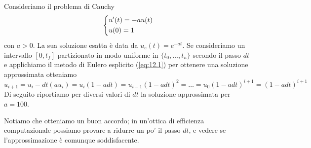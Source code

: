 \begin{example}
    Consideriamo il problema di Cauchy
    \[
    \begin{dcases}
        u'(t) = -au(t)\\
        u(0) = 1
    \end{dcases}
    \]
    con $a>0$. La sua soluzione esatta è data da $u_e(t) = e^{-at}$. Se consideriamo un intervallo $[0, t_f]$ partizionato in modo uniforme in $\{t_0, \dots, t_n\}$ secondo il passo $dt$ e applichiamo il metodo di Eulero esplicito (\ref{eq:12.1}) per ottenere una soluzione approssimata otteniamo
    \[
    u_{i+1} = u_i-dt(au_i) = u_i(1-adt) = u_{i-1}(1-adt)^2 = \dots = u_0(1-adt)^{i+1} = (1-adt)^{i+1}
    \]
    Di seguito riportiamo per diversi valori di $dt$ la soluzione approssimata per $a=100$.
    \begin{center}
    \end{center}
    Notiamo che otteniamo un buon accordo; in un'ottica di efficienza computazionale possiamo provare a ridurre un po' il passo $dt$, e vedere se l'approssimazione è comunque soddisfacente.

\end{example}
